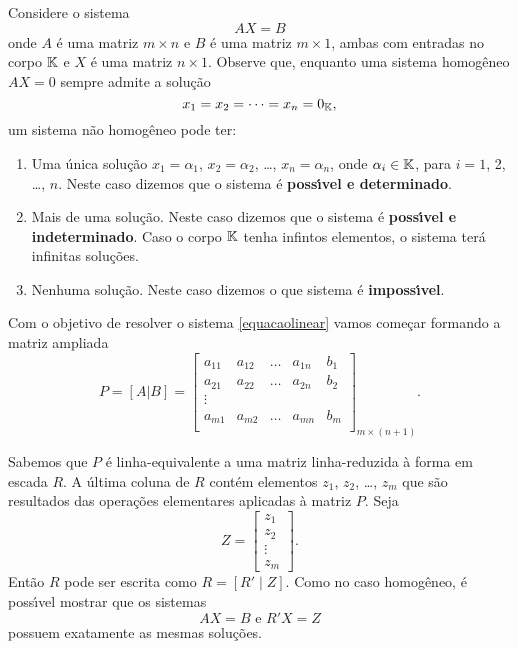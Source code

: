 Considere o sistema
\begin{equation}\label{equacaolinear}
	AX = B
\end{equation}
onde $A$ \'e uma matriz $m \times n$ e $B$ \'e uma matriz $m \times 1$, ambas com entradas no corpo $\mathbb{K}$ e $X$ \'e uma matriz $n \times 1$. Observe que, enquanto uma sistema homog\^eneo $AX = 0$ sempre admite a solu\c{c}\~ao
\[
	x_1 = x_2 = \cdots = x_n = 0_{\mathbb{K}},
\]
um sistema n\~ao homog\^eneo pode ter:
\begin{enumerate}
	\item Uma \'unica solu\c{c}\~ao $x_1 = \alpha_1$, $x_2 = \alpha_2$, \dots, $x_n = \alpha_n$, onde $\alpha_i \in \mathbb{K}$, para $i = 1$, 2, \dots, $n$. Neste caso dizemos que o sistema \'e \textbf{poss{\'\i}vel e determinado}.
	\item Mais de uma solu\c{c}\~ao. Neste caso dizemos que o sistema \'e \textbf{poss{\'\i}vel e indeterminado}. Caso o corpo $\mathbb{K}$ tenha infintos elementos, o sistema ter\'a infinitas solu\c{c}\~oes.
	\item Nenhuma solu\c{c}\~ao. Neste caso dizemos o que sistema \'e \textbf{imposs{\'\i}vel}.
\end{enumerate}

Com o objetivo de resolver o sistema \eqref{equacaolinear} vamos come\c{c}ar formando a matriz ampliada
\[
	P = [A|B] = \begin{bmatrix}
					a_{11} & a_{12} & \dots & a_{1n} & b_1\\
					a_{21} & a_{22} & \dots & a_{2n} & b_2\\
					\vdots\\
					a_{m1} & a_{m2} & \dots & a_{mn} & b_m\\
				\end{bmatrix}_{m \times (n + 1)}.
\]

Sabemos que $P$ \'e linha-equivalente a uma matriz linha-reduzida \`a forma em escada $R$. A \'ultima coluna de $R$ cont\'em elementos $z_1$, $z_2$, \dots, $z_m$ que s\~ao resultados das opera\c{c}\~oes elementares aplicadas \`a matriz $P$. Seja 
\[
	Z = \begin{bmatrix}
			z_1\\
			z_2\\
			\vdots\\
			z_m
		\end{bmatrix}.
\]
Ent\~ao $R$ pode ser escrita como $R = [R' \mid Z]$. Como no caso homog\^eneo, \'e poss{\'\i}vel mostrar que os sistemas
\[
	AX = B \mbox{ e } R'X = Z
\]
possuem exatamente as mesmas solu\c{c}\~oes.

